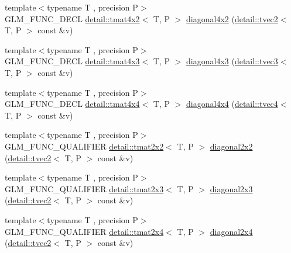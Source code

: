 \begin{DoxyCompactItemize}
{\footnotesize template$<$typename T , precision P$>$ }\\G\+L\+M\+\_\+\+F\+U\+N\+C\+\_\+\+D\+E\+CL \hyperlink{structglm_1_1detail_1_1tmat4x2}{detail\+::tmat4x2}$<$ T, P $>$ \hyperlink{group__gtx__matrix__operation_ga1ec0fc953d871fc9894bcfcc81dbaf68}{diagonal4x2} (\hyperlink{structglm_1_1detail_1_1tvec2}{detail\+::tvec2}$<$ T, P $>$ const \&v)
\item 
{\footnotesize template$<$typename T , precision P$>$ }\\G\+L\+M\+\_\+\+F\+U\+N\+C\+\_\+\+D\+E\+CL \hyperlink{structglm_1_1detail_1_1tmat4x3}{detail\+::tmat4x3}$<$ T, P $>$ \hyperlink{group__gtx__matrix__operation_gaff804ead2f02ac48c8daf0d44a81d224}{diagonal4x3} (\hyperlink{structglm_1_1detail_1_1tvec3}{detail\+::tvec3}$<$ T, P $>$ const \&v)
\item 
{\footnotesize template$<$typename T , precision P$>$ }\\G\+L\+M\+\_\+\+F\+U\+N\+C\+\_\+\+D\+E\+CL \hyperlink{structglm_1_1detail_1_1tmat4x4}{detail\+::tmat4x4}$<$ T, P $>$ \hyperlink{group__gtx__matrix__operation_ga0c286e9aa92074f12663617cfedfa72c}{diagonal4x4} (\hyperlink{structglm_1_1detail_1_1tvec4}{detail\+::tvec4}$<$ T, P $>$ const \&v)
\item 
{\footnotesize template$<$typename T , precision P$>$ }\\G\+L\+M\+\_\+\+F\+U\+N\+C\+\_\+\+Q\+U\+A\+L\+I\+F\+I\+ER \hyperlink{structglm_1_1detail_1_1tmat2x2}{detail\+::tmat2x2}$<$ T, P $>$ \hyperlink{group__gtx__matrix__operation_gae4177a43a89e6b4b7352f82198f2ea84}{diagonal2x2} (\hyperlink{structglm_1_1detail_1_1tvec2}{detail\+::tvec2}$<$ T, P $>$ const \&v)
\item 
{\footnotesize template$<$typename T , precision P$>$ }\\G\+L\+M\+\_\+\+F\+U\+N\+C\+\_\+\+Q\+U\+A\+L\+I\+F\+I\+ER \hyperlink{structglm_1_1detail_1_1tmat2x3}{detail\+::tmat2x3}$<$ T, P $>$ \hyperlink{group__gtx__matrix__operation_ga873468c41cb29fb84a12a866549e0136}{diagonal2x3} (\hyperlink{structglm_1_1detail_1_1tvec2}{detail\+::tvec2}$<$ T, P $>$ const \&v)
\item 
{\footnotesize template$<$typename T , precision P$>$ }\\G\+L\+M\+\_\+\+F\+U\+N\+C\+\_\+\+Q\+U\+A\+L\+I\+F\+I\+ER \hyperlink{structglm_1_1detail_1_1tmat2x4}{detail\+::tmat2x4}$<$ T, P $>$ \hyperlink{group__gtx__matrix__operation_gaf97e094855cc3c6186b879d045f67aca}{diagonal2x4} (\hyperlink{structglm_1_1detail_1_1tvec2}{detail\+::tvec2}$<$ T, P $>$ const \&v)
\item 

\end{DoxyCompactItemize}

